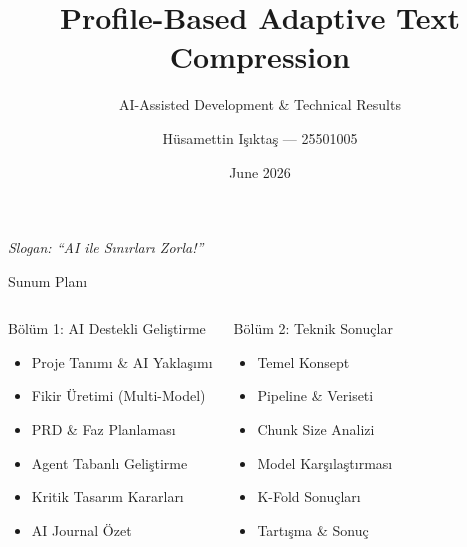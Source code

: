 \documentclass[10pt,aspectratio=43]{beamer}
\title{Profile-Based Adaptive Text Compression}
\subtitle{AI-Assisted Development \& Technical Results}
\author{Hüsamettin Işıktaş — 25501005}
\institute{YTÜ Bilgisayar Mühendisliği \\ BLM6106 -- Veri Sıkıştırma \\ Danışman: Banu DİRİ}
\date{June 2026}
\begin{document}
\begin{frame}[plain]
  \titlepage
  \vspace{-2em}
  \begin{center}
    \scriptsize\textit{Slogan: ``AI ile Sınırları Zorla!''}
  \end{center}
\end{frame}

\begin{frame}{Sunum Planı}
  \begin{columns}[T]
    \begin{block}{Bölüm 1: AI Destekli Geliştirme}
      \begin{itemize}
        \setlength{\itemsep}{0.5em}
        \item Proje Tanımı \& AI Yaklaşımı
        \item Fikir Üretimi (Multi-Model)
        \item PRD \& Faz Planlaması
        \item Agent Tabanlı Geliştirme
        \item Kritik Tasarım Kararları
        \item AI Journal Özet
      \end{itemize}
    \end{block}

    \begin{block}{Bölüm 2: Teknik Sonuçlar}
      \begin{itemize}
        \setlength{\itemsep}{0.5em}
        \item Temel Konsept
        \item Pipeline \& Veriseti
        \item Chunk Size Analizi
        \item Model Karşılaştırması
        \item K-Fold Sonuçları
        \item Tartışma \& Sonuç
      \end{itemize}
    \end{block}
  \end{columns}
\end{frame}

\end{document}
